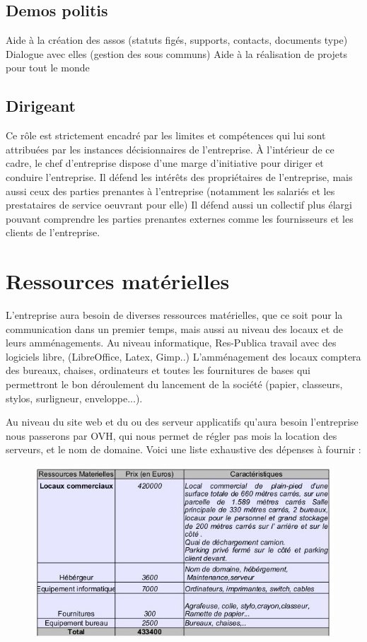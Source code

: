 \documentclass[11pt]{article}
\begin{document}
\subsection{Demos politis}
\label{sec:}
Aide à la création des assos (statuts figés, supports, contacts, documents type)
Dialogue avec elles (gestion des sous communs)
Aide à la réalisation de projets pour tout le monde

\subsection{Dirigeant}
\label{sec:dirigeant}
Ce rôle est strictement encadré par les limites et compétences qui lui sont attribuées par les instances décisionnaires de l'entreprise. À l'intérieur de ce cadre, le chef d'entreprise dispose d'une marge d'initiative pour diriger et conduire l'entreprise.
Il défend les intérêts des propriétaires de l'entreprise, mais aussi ceux des parties prenantes à l'entreprise (notamment les salariés et les prestataires de service oeuvrant pour elle)
Il défend aussi un collectif plus élargi pouvant comprendre les parties prenantes externes comme les fournisseurs et  les clients de l'entreprise.


\section{Ressources matérielles}
\label{sec:ressources}
L'entreprise aura besoin de diverses ressources matérielles, que ce soit pour la communication dans un premier temps, mais aussi au niveau des locaux et de leurs amménagements. 
Au niveau informatique, Res-Publica travail avec des logiciels libre, (LibreOffice, Latex, Gimp..)
L'amménagement des locaux comptera des bureaux, chaises, ordinateurs et toutes les fournitures de bases qui permettront le bon déroulement du lancement de la société (papier, classeurs, stylos, surligneur, enveloppe...).

Au niveau du site web et du ou des serveur applicatifs qu'aura besoin l'entreprise nous passerons par OVH, qui nous permet de régler pas mois la location des serveurs, et le nom de domaine.
Voici une liste exhaustive des dépenses à fournir : \\
\begin{figure}[h]
\includegraphics[scale=0.50]{BP.jpg}
\end{figure}
\end{document}
